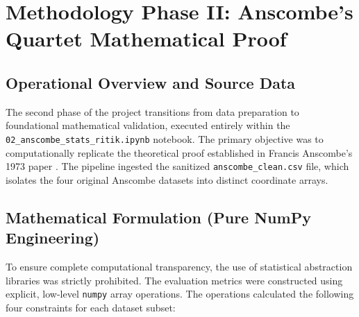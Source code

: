 \documentclass[12pt, a4paper]{article}
\begin{document}
\section{Methodology Phase II: Anscombe's Quartet Mathematical Proof}
\subsection{Operational Overview and Source Data}
The second phase of the project transitions from data preparation to foundational mathematical validation, executed entirely within the \texttt{02\_anscombe\_stats\_ritik.ipynb} notebook. The primary objective was to computationally replicate the theoretical proof established in Francis Anscombe's 1973 paper \cite{anscombe1973}. The pipeline ingested the sanitized \texttt{anscombe\_clean.csv} file, which isolates the four original Anscombe datasets into distinct coordinate arrays. 

\subsection{Mathematical Formulation (Pure NumPy Engineering)}
To ensure complete computational transparency, the use of statistical abstraction libraries was strictly prohibited. The evaluation metrics were constructed using explicit, low-level \texttt{numpy} array operations. The operations calculated the following four constraints for each dataset subset:
\end{document}
